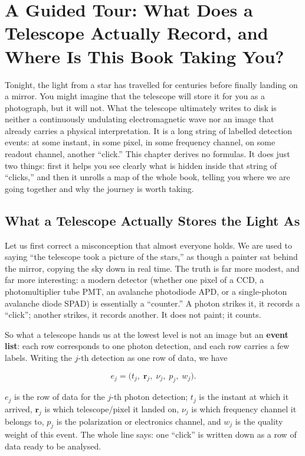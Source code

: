 \chapter{A Guided Tour: What Does a Telescope Actually Record, and Where Is This Book Taking You?}
\label{chap:e00}

\begin{chapteropening}
Tonight, the light from a star has travelled for centuries before finally landing on a mirror. You might imagine that the telescope will store it for you as a photograph, but it will not. What the telescope ultimately writes to disk is neither a continuously undulating electromagnetic wave nor an image that already carries a physical interpretation. It is a long string of labelled detection events: at some instant, in some pixel, in some frequency channel, on some readout channel, another ``click.'' This chapter derives no formulas. It does just two things: first it helps you see clearly what is hidden inside that string of ``clicks,'' and then it unrolls a map of the whole book, telling you where we are going together and why the journey is worth taking.
\end{chapteropening}

\section{What a Telescope Actually Stores the Light As}
\label{sec:e00-event}

Let us first correct a misconception that almost everyone holds. We are used to saying ``the telescope took a picture of the stars,'' as though a painter sat behind the mirror, copying the sky down in real time. The truth is far more modest, and far more interesting: a modern detector (whether one pixel of a CCD, a photomultiplier tube PMT, an avalanche photodiode APD, or a single-photon avalanche diode SPAD) is essentially a ``counter.'' A photon strikes it, it records a ``click''; another strikes, it records another. It does not paint; it counts.

So what a telescope hands us at the lowest level is not an image but an \textbf{event list}: each row corresponds to one photon detection, and each row carries a few labels. Writing the $j$-th detection as one row of data, we have

\begin{equation}
  e_j=\bigl(t_j,\;\bm r_j,\;\nu_j,\;p_j,\;w_j\bigr).
  \label{eq:e00-event}
\end{equation}
\begin{formulaexplain}
\(e_j\) is the row of data for the \(j\)-th photon detection; \(t_j\) is the instant at which it arrived, \(\bm r_j\) is which telescope/pixel it landed on, \(\nu_j\) is which frequency channel it belongs to, \(p_j\) is the polarization or electronics channel, and \(w_j\) is the quality weight of this event. The whole line says: one ``click'' is written down as a row of data ready to be analysed.
\end{formulaexplain}

